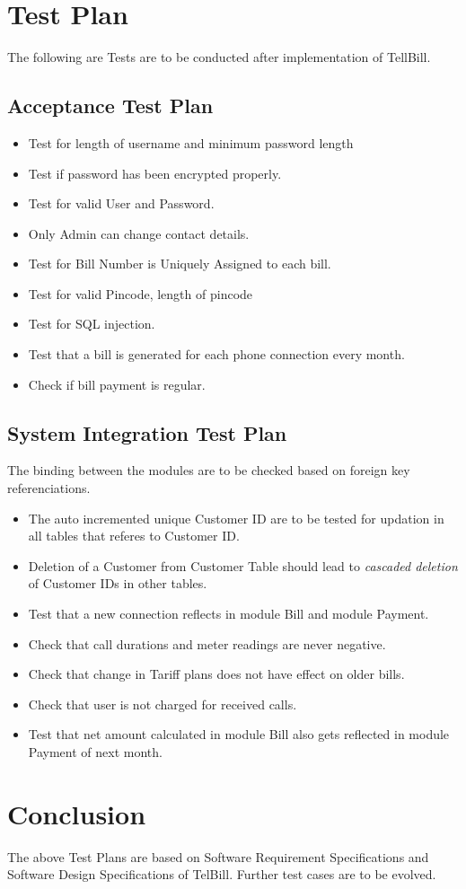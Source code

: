 \documentclass[10pt, oneside, a4paper]{article}
\begin{document}
\section{Test Plan}
The following are Tests are to be conducted after implementation of TellBill. 


\subsection{Acceptance Test Plan}
\begin{itemize}
\item Test for length of username and minimum password length
\item Test if password has been encrypted properly.
\item Test for valid User and Password.
\item Only Admin can change contact details.
\item Test for Bill Number is Uniquely Assigned to each bill.
\item Test for valid Pincode, length of pincode
\item Test for SQL injection.
\item Test that a bill is generated for each phone connection every month.
\item Check if bill payment is regular.

\end{itemize}



\subsection{System Integration Test Plan}
The binding between the modules are to be checked based on foreign key referenciations.\\
\begin{itemize}
\item	The auto incremented unique Customer ID are to be tested for updation in all tables that referes to Customer ID. 
\item Deletion of a Customer from Customer Table should lead to \emph{cascaded deletion} of Customer IDs in other tables.
\item Test that a new connection reflects in module Bill and module Payment.
\item Check that call durations and meter readings are never negative.
\item Check that change in Tariff plans does not have effect on older bills.
\item Check that user is not charged for received calls.
\item Test that net amount calculated in module Bill also gets reflected in module Payment of next month.
\end{itemize}

\section{Conclusion}
	The above Test Plans are based on Software Requirement Specifications and Software Design Specifications of TelBill.
	 Further test cases are to be evolved.
\end{document}
